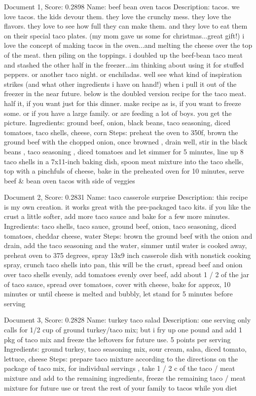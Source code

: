 \documentclass[a4paper,11pt]{article}
\begin{document}
Document 1, Score: 0.2898
Name: beef bean oven tacos
Description: tacos.  we love tacos.  the kids devour them.  they love the crunchy mess.  they love the flavors.  they love to see how full they can make them.  and they love to eat them on their special taco plates.  (my mom gave us some for christmas...great gift!)  i love the concept of making tacos in the oven...and melting the cheese over the top of the meat.  then piling on the toppings.  i doubled up the beef-bean taco meat and stashed the other half in the freezer...im thinking about using it for stuffed peppers.  or another taco night.  or enchiladas.  well see what kind of inspiration strikes (and what other ingredients i have on hand!) when i pull it out of the freezer in the near future.  below is the doubled version recipe for the taco meat.  half it, if you want just for this dinner.  make recipe as is, if you want to freeze some.  or if you have a large family.  or are feeding a lot of boys.  you get the picture.
Ingredients: ground beef, onion, black beans, taco seasoning, diced tomatoes, taco shells, cheese, corn
Steps: preheat the oven to 350f, brown the ground beef with the chopped onion, once browned , drain well, stir in the black beans , taco seasoning , diced tomatoes and let simmer for 5 minutes, line up 8 taco shells in a 7x11-inch baking dish, spoon meat mixture into the taco shells, top with a pinchfuls of cheese, bake in the preheated oven for 10 minutes, serve beef \& bean oven tacos with side of veggies

Document 2, Score: 0.2831
Name: taco casserole surprise
Description: this recipe is my own creation. it works great with the pre-packaged taco kits. if you like the crust a little softer, add more taco sauce and bake for a few more minutes.
Ingredients: taco shells, taco sauce, ground beef, onion, taco seasoning, diced tomatoes, cheddar cheese, water
Steps: brown the ground beef with the onion and drain, add the taco seasoning and the water, simmer until water is cooked away, preheat oven to 375 degrees, spray 13x9 inch casserole dish with nonstick cooking spray, crunch taco shells into pan, this will be the crust, spread beef and onion over taco shells evenly, add tomatoes evenly over beef, add about 1 / 2 of the jar of taco sauce, spread over tomatoes, cover with cheese, bake for approx, 10 minutes or until cheese is melted and bubbly, let stand for 5 minutes before serving

Document 3, Score: 0.2828
Name: turkey taco salad
Description: one serving only calls for 1/2 cup of ground turkey/taco mix; but i fry up one pound and add 1 pkg of taco mix and freeze the leftovers for future use. 5 points per serving
Ingredients: ground turkey, taco seasoning mix, sour cream, salsa, diced tomato, lettuce, cheese
Steps: prepare taco mixture according to the directions on the package of taco mix, for individual servings , take 1 / 2 c of the taco / meat mixture and add to the remaining ingredients, freeze the remaining taco / meat mixture for future use or treat the rest of your family to tacos while you diet
\end{document}
